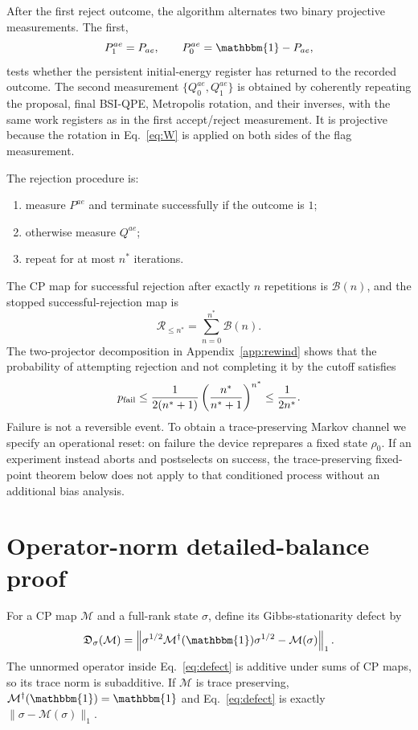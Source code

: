 \documentclass[aps,floatfix,10pt,amssymb,amsmath,superscriptaddress,nofootinbib,longbibliography,nobalancelastpage,twocolumn]{revtex4-2}
\newcommand{\id}{\mathbbm{1}}
\newcommand{\cB}{\mathcal{B}}
\newcommand{\cM}{\mathcal{M}}
\newcommand{\cR}{\mathcal{R}}
\begin{document}
After the first reject outcome, the algorithm alternates two binary projective measurements.  The first,
\begin{equation}
 P_1^{ae}=P_{ae},\qquad P_0^{ae}=\id-P_{ae},
 \label{eq:P-measurement}
\end{equation}
tests whether the persistent initial-energy register has returned to the recorded outcome.  The second measurement $\{Q_0^{ae},Q_1^{ae}\}$ is obtained by coherently repeating the proposal, final BSI-QPE, Metropolis rotation, and their inverses, with the same work registers as in the first accept/reject measurement.  It is projective because the rotation in Eq.~\eqref{eq:W} is applied on both sides of the flag measurement.

The rejection procedure is:
\begin{enumerate}
 \item measure $P^{ae}$ and terminate successfully if the outcome is $1$;
 \item otherwise measure $Q^{ae}$;
 \item repeat for at most $n^*$ iterations.
\end{enumerate}
The CP map for successful rejection after exactly $n$ repetitions is $\cB(n)$, and the stopped successful-rejection map is
\begin{equation}
 \cR_{\leq n^*}=\sum_{n=0}^{n^*}\cB(n).
 \label{eq:stopped-map}
\end{equation}
The two-projector decomposition in Appendix~\ref{app:rewind} shows that the probability of attempting rejection and not completing it by the cutoff satisfies
\begin{equation}
 p_{\rm fail}\leq
 \frac{1}{2(n^*+1)}\left(\frac{n^*}{n^*+1}\right)^{n^*}
 \leq\frac{1}{2n^*}.
 \label{eq:failure-probability}
\end{equation}
Failure is not a reversible event.  To obtain a trace-preserving Markov channel we specify an operational reset: on failure the device reprepares a fixed state $\rho_0$.  If an experiment instead aborts and postselects on success, the trace-preserving fixed-point theorem below does not apply to that conditioned process without an additional bias analysis.

\section{Operator-norm detailed-balance proof}
\label{sec:proof}

For a CP map $\cM$ and a full-rank state $\sigma$, define its Gibbs-stationarity defect by
\begin{equation}
 \mathfrak D_\sigma(\cM)=
 \left\|\sigma^{1/2}\cM^\dagger(\id)\sigma^{1/2}-\cM(\sigma)\right\|_1.
 \label{eq:defect}
\end{equation}
The unnormed operator inside Eq.~\eqref{eq:defect} is additive under sums of CP maps, so its trace norm is subadditive.  If $\cM$ is trace preserving, $\cM^\dagger(\id)=\id$ and Eq.~\eqref{eq:defect} is exactly $\|\sigma-\cM(\sigma)\|_1$.
\end{document}
